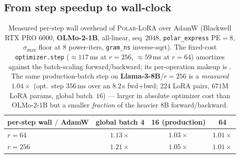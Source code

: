 \documentclass[11pt]{article}
\newcommand{\smax}{\sigma_{\max}}
\newcommand{\methodname}{\textsc{Polar-LoRA}\xspace}
\theoremstyle{plain}
\theoremstyle{definition}
\theoremstyle{remark}
\begin{document}
\subsection{From step speedup to wall-clock}
\label{sec:exp-walltime}
\begin{table}[h]\centering\small
\begin{tabular}{lccc}
\toprule
per-step wall $/$ AdamW & global batch 4 & 16 (production) & 64 \\
\midrule
$r=64$  & $1.13\times$ & $1.03\times$ & $1.01\times$ \\
$r=256$ & $1.21\times$ & $1.05\times$ & $1.01\times$ \\
\bottomrule
\end{tabular}
\caption{Measured per-step wall overhead of \methodname{} over AdamW (Blackwell
RTX PRO 6000, \textbf{OLMo-2-1B}, all-linear, seq~2048, \texttt{polar\_express}
PE${=}8$, $\smax$ floor at 8 power-iters, \texttt{gram\_ns} inverse-sqrt). The
fixed-cost \texttt{optimizer.step} ($\approx117$\,ms at $r{=}256$, $\approx59$\,ms
at $r{=}64$) amortizes against the batch-scaling forward/backward; its
per-operation makeup is . The same production-batch step on
\textbf{Llama-3-8B}/$r{=}256$ is a \emph{measured} $1.04\times$ (opt.\ step
$356$\,ms over an $8.2$\,s fwd+bwd; $224$ LoRA pairs, $671$M LoRA params, global
batch~$16$) --- larger in absolute optimizer cost than OLMo-2-1B but a smaller
\emph{fraction} of the heavier $8$B forward/backward.}
\end{table}
\end{document}
